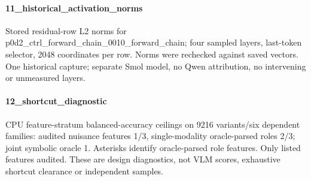 \paragraph{11\_historical\_activation\_norms} Stored residual-row L2 norms for p0d2\_ctrl\_forward\_chain\_0010\_forward\_chain; four sampled layers, last-token selector, 2048 coordinates per row. Norms were rechecked against saved vectors. One historical capture; separate Smol model, no Qwen attribution, no intervening or unmeasured layers.

\paragraph{12\_shortcut\_diagnostic} CPU feature-stratum balanced-accuracy ceilings on 9216 variants/six dependent families: audited nuisance features 1/3, single-modality oracle-parsed roles 2/3; joint symbolic oracle 1. Asterisks identify oracle-parsed role features. Only listed features audited. These are design diagnostics, not VLM scores, exhaustive shortcut clearance or independent samples.
